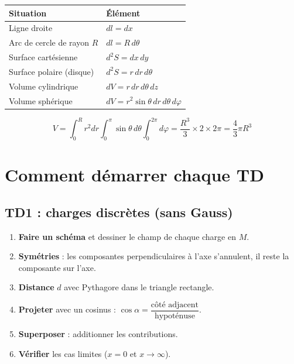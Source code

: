 \documentclass[11pt,a4paper]{article}
\begin{document}
\begin{center}
\renewcommand{\arraystretch}{1.8}
\begin{tabular}{>{\raggedright\arraybackslash}m{6cm} >{\raggedright\arraybackslash}m{6cm}}
\toprule
\rowcolor{rosepale}
\textcolor{rosevif}{\textbf{Situation}} & \textcolor{rosevif}{\textbf{Élément}}\\
\midrule
Ligne droite & $dl=dx$\\
Arc de cercle de rayon $R$ & $dl=R\,d\theta$\\
Surface cartésienne & $d^2S=dx\,dy$\\
Surface polaire (disque) & $d^2S=r\,dr\,d\theta$\\
Volume cylindrique & $dV=r\,dr\,d\theta\,dz$\\
Volume sphérique & $dV=r^{2}\sin\theta\,dr\,d\theta\,d\varphi$\\
\bottomrule
\end{tabular}
\end{center}

\begin{formule}
\[
V=\int_0^R r^2dr\int_0^\pi\sin\theta\,d\theta\int_0^{2\pi}d\varphi
=\frac{R^3}{3}\times 2\times 2\pi=\frac{4}{3}\pi R^3
\]
\end{formule}

\section{Comment démarrer chaque TD}

\subsection{TD1 : charges discrètes (sans Gauss)}

\begin{methode}
\begin{enumerate}[leftmargin=1.5em]
  \item \textbf{Faire un schéma} et dessiner le champ de chaque charge en $M$.
  \item \textbf{Symétries} : les composantes perpendiculaires à l'axe s'annulent, il reste la composante sur l'axe.
  \item \textbf{Distance} $d$ avec Pythagore dans le triangle rectangle.
  \item \textbf{Projeter} avec un cosinus : $\cos\alpha=\dfrac{\text{côté adjacent}}{\text{hypoténuse}}$.
  \item \textbf{Superposer} : additionner les contributions.
  \item \textbf{Vérifier} les cas limites ($x=0$ et $x\to\infty$).
\end{enumerate}
\end{methode}
\end{document}
